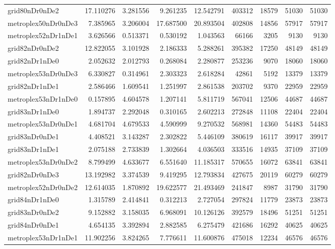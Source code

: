 \documentclass[../../../thesis.tex]{subfiles}
\begin{document}
\begin{longtable}{|l|r|r|r|r|r|r|r|r|}
grid80nDr0nDe2 & 17.110276 & 3.281556 & 9.261235 & 12.542791 & 403312 & 18579 & 51030 & 51030 \\
metroplex50nDr0nDe3 & 7.385965 & 3.206004 & 17.687500 & 20.893504 & 402808 & 14856 & 57917 & 57917 \\
metroplex52nDr1nDe1 & 3.626566 & 0.513371 & 0.530192 & 1.043563 & 66166 & 3205 & 9130 & 9130 \\
grid82nDr0nDe2 & 12.822055 & 3.101928 & 2.186333 & 5.288261 & 395382 & 17250 & 48149 & 48149 \\
grid82nDr1nDe0 & 2.052632 & 2.012793 & 0.268084 & 2.280877 & 253236 & 9070 & 18060 & 18060 \\
metroplex53nDr0nDe3 & 6.330827 & 0.314961 & 2.303323 & 2.618284 & 42861 & 5192 & 13379 & 13379 \\
grid82nDr1nDe1 & 2.586466 & 1.609541 & 1.251997 & 2.861538 & 203702 & 9370 & 22959 & 22959 \\
metroplex53nDr1nDe0 & 0.157895 & 4.604578 & 1.207141 & 5.811719 & 567041 & 12506 & 44687 & 44687 \\
grid83nDr1nDe0 & 1.894737 & 2.292048 & 0.310165 & 2.602213 & 272848 & 11108 & 22404 & 22404 \\
metroplex53nDr0nDe1 & 4.681704 & 4.679533 & 4.590999 & 9.270532 & 568981 & 14360 & 54483 & 54483 \\
grid83nDr0nDe1 & 4.408521 & 3.143287 & 2.302822 & 5.446109 & 380619 & 16117 & 39917 & 39917 \\
grid83nDr1nDe1 & 2.075188 & 2.733839 & 1.302664 & 4.036503 & 333516 & 14935 & 37109 & 37109 \\
metroplex53nDr0nDe2 & 8.799499 & 4.633677 & 6.551640 & 11.185317 & 570655 & 16072 & 63841 & 63841 \\
grid82nDr0nDe3 & 13.192982 & 3.374539 & 9.419295 & 12.793834 & 427675 & 20119 & 60279 & 60279 \\
metroplex52nDr0nDe2 & 12.614035 & 1.870892 & 19.622577 & 21.493469 & 241847 & 8987 & 31790 & 31790 \\
grid84nDr1nDe0 & 1.315789 & 2.414841 & 0.312213 & 2.727054 & 297824 & 11779 & 23873 & 23873 \\
grid83nDr0nDe2 & 9.152882 & 3.158035 & 6.968091 & 10.126126 & 392579 & 18496 & 51251 & 51251 \\
grid84nDr0nDe1 & 4.654135 & 3.392894 & 2.882585 & 6.275479 & 421686 & 16292 & 40625 & 40625 \\
metroplex53nDr1nDe1 & 11.902256 & 3.824265 & 7.776611 & 11.600876 & 475018 & 12234 & 46576 & 46576 \\

\end{longtable}
\end{document}
